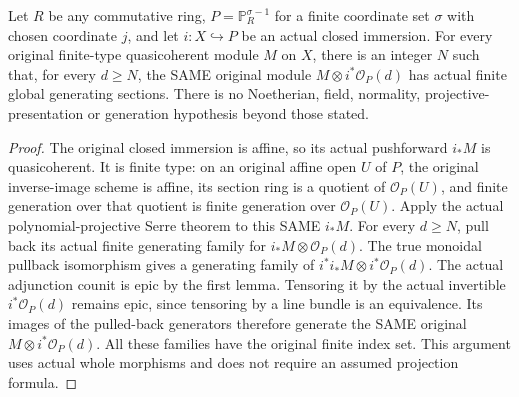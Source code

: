 \begin{theorem}
\label{thm:actual-closed-projective-global-generation}
\leanok
{}
Let $R$ be any commutative ring, $P=\mathbb P_R^{\sigma-1}$ for a finite
coordinate set $\sigma$ with chosen coordinate $j$, and let $i:X\hookrightarrow P$
be an actual closed immersion. For every original finite-type quasicoherent
module $M$ on $X$, there is an integer $N$ such that, for every $d\ge N$,
the SAME original module $M\otimes i^*\mathcal O_P(d)$ has actual finite
global generating sections. There is no Noetherian, field, normality,
projective-presentation or generation hypothesis beyond those stated.
\end{theorem}
\begin{proof}
The original closed immersion is affine, so its actual pushforward $i_*M$
is quasicoherent. It is finite type: on an original affine open $U$ of $P$,
the original inverse-image scheme is affine, its section ring is a quotient
of $\mathcal O_P(U)$, and finite generation over that quotient is finite
generation over $\mathcal O_P(U)$. Apply the actual polynomial-projective
Serre theorem to this SAME $i_*M$. For every $d\ge N$, pull back its actual
finite generating family for $i_*M\otimes\mathcal O_P(d)$. The true monoidal
pullback isomorphism gives a generating family of
$i^*i_*M\otimes i^*\mathcal O_P(d)$. The actual adjunction counit is epic by
the first lemma. Tensoring it by the actual invertible $i^*\mathcal O_P(d)$
remains epic, since tensoring by a line bundle is an equivalence. Its images
of the pulled-back generators therefore generate the SAME original
$M\otimes i^*\mathcal O_P(d)$. All these families have the original finite
index set. This argument uses actual whole morphisms and does not require
an assumed projection formula.
\end{proof}
